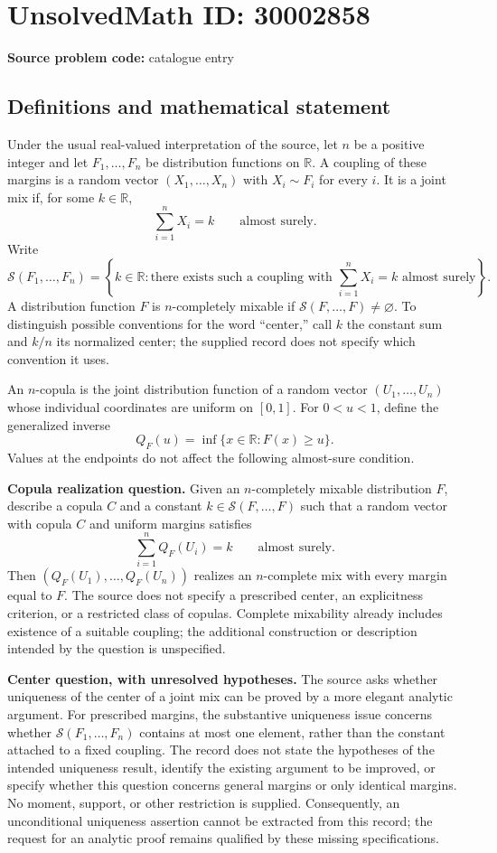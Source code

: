 \documentclass[11pt]{article}
\newcommand{\R}{\mathbb{R}}
\begin{document}
\section*{UnsolvedMath ID: 30002858}
\textbf{Source problem code:} catalogue entry
\subsection{Definitions and mathematical statement}
Under the usual real-valued interpretation of the source, let \(n\) be a positive integer and let \(F_1,\ldots,F_n\) be distribution functions on \(\R\). A coupling of these margins is a random vector \((X_1,\ldots,X_n)\) with \(X_i\sim F_i\) for every \(i\). It is a joint mix if, for some \(k\in\R\),
\[
\sum_{i=1}^{n}X_i=k\qquad\text{almost surely}.
\]
Write
\[
\mathcal S(F_1,\ldots,F_n)=\left\{k\in\R:\text{there exists such a coupling with }\sum_{i=1}^{n}X_i=k\text{ almost surely}\right\}.
\]
A distribution function \(F\) is \(n\)-completely mixable if \(\mathcal S(F,\ldots,F)\ne\varnothing\). To distinguish possible conventions for the word ``center,'' call \(k\) the constant sum and \(k/n\) its normalized center; the supplied record does not specify which convention it uses.

An \(n\)-copula is the joint distribution function of a random vector \((U_1,\ldots,U_n)\) whose individual coordinates are uniform on \([0,1]\). For \(0<u<1\), define the generalized inverse
\[
Q_F(u)=\inf\{x\in\R:F(x)\ge u\}.
\]
Values at the endpoints do not affect the following almost-sure condition.

\textbf{Copula realization question.} Given an \(n\)-completely mixable distribution \(F\), describe a copula \(C\) and a constant \(k\in\mathcal S(F,\ldots,F)\) such that a random vector with copula \(C\) and uniform margins satisfies
\[
\sum_{i=1}^{n}Q_F(U_i)=k\qquad\text{almost surely}.
\]
Then \((Q_F(U_1),\ldots,Q_F(U_n))\) realizes an \(n\)-complete mix with every margin equal to \(F\). The source does not specify a prescribed center, an explicitness criterion, or a restricted class of copulas. Complete mixability already includes existence of a suitable coupling; the additional construction or description intended by the question is unspecified.

\textbf{Center question, with unresolved hypotheses.} The source asks whether uniqueness of the center of a joint mix can be proved by a more elegant analytic argument. For prescribed margins, the substantive uniqueness issue concerns whether \(\mathcal S(F_1,\ldots,F_n)\) contains at most one element, rather than the constant attached to a fixed coupling. The record does not state the hypotheses of the intended uniqueness result, identify the existing argument to be improved, or specify whether this question concerns general margins or only identical margins. No moment, support, or other restriction is supplied. Consequently, an unconditional uniqueness assertion cannot be extracted from this record; the request for an analytic proof remains qualified by these missing specifications.
\end{document}
